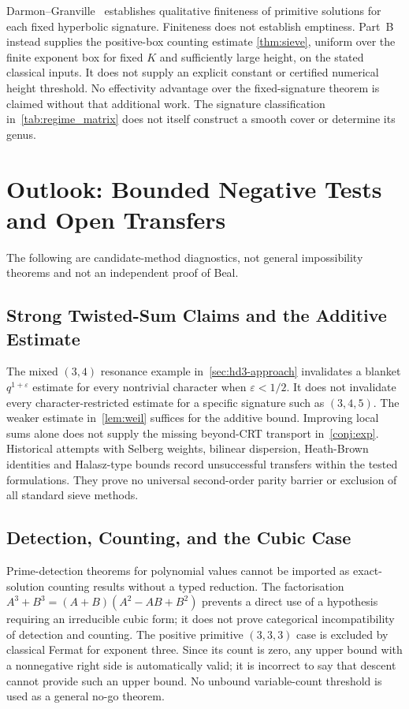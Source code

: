 \documentclass[11pt,a4paper]{article}
\begin{document}
Darmon--Granville~\cite{DarmonGranville1995} establishes qualitative
finiteness of primitive solutions for each fixed hyperbolic
signature. Finiteness does not establish emptiness.
Part~B instead supplies the positive-box counting estimate
\cref{thm:sieve}, uniform over the finite exponent box for fixed $K$
and sufficiently large height, on the stated classical inputs.
It does not supply an explicit constant or certified numerical height
threshold. No effectivity advantage over the fixed-signature theorem
is claimed without that additional work. The signature classification
in~\cref{tab:regime_matrix} does not itself construct a smooth cover
or determine its genus.

\section{Outlook: Bounded Negative Tests and Open Transfers}
\label{sec:outlook}

The following are candidate-method diagnostics, not general
impossibility theorems and not an independent proof of Beal.

\subsection{Strong Twisted-Sum Claims and the Additive Estimate}
\label{sec:outlook-elim1}

The mixed $(3,4)$ resonance example in~\cref{sec:hd3-approach}
invalidates a blanket $q^{1+\varepsilon}$ estimate for every
nontrivial character when $\varepsilon<1/2$.
It does not invalidate every character-restricted estimate for a
specific signature such as $(3,4,5)$.
The weaker estimate in~\cref{lem:weil} suffices for the additive
bound. Improving local sums alone does not supply the missing
beyond-CRT transport in~\cref{conj:exp}.
Historical attempts with Selberg weights, bilinear dispersion,
Heath-Brown identities and Halasz-type bounds
\cite{BFI1986,HB1982,HalaszPretentious} record unsuccessful transfers
within the tested formulations. They prove no universal second-order
parity barrier or exclusion of all standard sieve methods.

\subsection{Detection, Counting, and the Cubic Case}
\label{sec:outlook-elim2}

Prime-detection theorems for polynomial values
\cite{FI1998a,FI1998b,HB2001,HBMoroz2002,Merikoski2022} cannot be
imported as exact-solution counting results without a typed reduction.
The factorisation $A^3+B^3=(A+B)(A^2-AB+B^2)$ prevents a direct use
of a hypothesis requiring an irreducible cubic form; it does not
prove categorical incompatibility of detection and counting.
The positive primitive $(3,3,3)$ case is excluded by classical
Fermat for exponent three. Since its count is zero, any upper bound
with a nonnegative right side is automatically valid; it is
incorrect to say that descent cannot provide such an upper bound.
No unbound variable-count threshold is used as a general no-go theorem.
\end{document}
